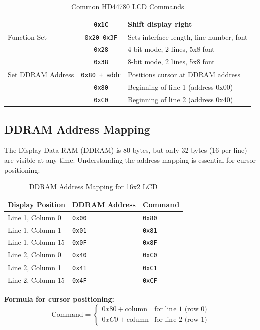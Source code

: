 \begin{table}[H]
\begin{tabular}{lcp{7.5cm}}
 & \texttt{0x1C} & Shift display right \\
\midrule
Function Set & \texttt{0x20-0x3F} & Sets interface length, line number, font \\
 & \texttt{0x28} & 4-bit mode, 2 lines, 5x8 font \\
 & \texttt{0x38} & 8-bit mode, 2 lines, 5x8 font \\
\midrule
Set DDRAM Address & \texttt{0x80 + addr} & Positions cursor at DDRAM address \\
 & \texttt{0x80} & Beginning of line 1 (address 0x00) \\
 & \texttt{0xC0} & Beginning of line 2 (address 0x40) \\
\bottomrule
\end{tabular}
\caption{Common HD44780 LCD Commands}
\end{table}

\subsection{DDRAM Address Mapping}

The Display Data RAM (DDRAM) is 80 bytes, but only 32 bytes (16 per line) are visible at any time. Understanding the address mapping is essential for cursor positioning:

\begin{table}[H]
\centering
\small
\renewcommand{\arraystretch}{1.2}
\begin{tabular}{lll}
\toprule
\textbf{Display Position} & \textbf{DDRAM Address} & \textbf{Command} \\
\midrule
Line 1, Column 0 & \texttt{0x00} & \texttt{0x80} \\
Line 1, Column 1 & \texttt{0x01} & \texttt{0x81} \\
Line 1, Column 15 & \texttt{0x0F} & \texttt{0x8F} \\
\midrule
Line 2, Column 0 & \texttt{0x40} & \texttt{0xC0} \\
Line 2, Column 1 & \texttt{0x41} & \texttt{0xC1} \\
Line 2, Column 15 & \texttt{0x4F} & \texttt{0xCF} \\
\bottomrule
\end{tabular}
\caption{DDRAM Address Mapping for 16x2 LCD}
\end{table}

\noindent
\textbf{Formula for cursor positioning:}
\[
\text{Command} = \begin{cases}
0x80 + \text{column} & \text{for line 1 (row 0)} \\
0xC0 + \text{column} & \text{for line 2 (row 1)}
\end{cases}
\]

